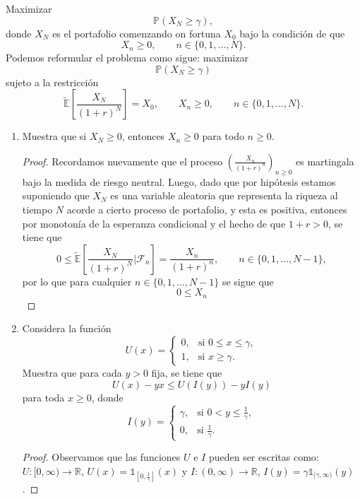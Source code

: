 \documentclass[letterpaper]{article}
\newcommand{\R}{\mathbb{R}}
\newcommand{\F}{\mathcal{F}}
\renewcommand{\to}{\rightarrow}
\newcommand{\E}{\mathbb{E}}
\renewcommand{\P}{\mathbb{P}}
\newcommand{\1}{\mathds{1}}
\theoremstyle{definition}
\theoremstyle{definition}
\theoremstyle{definition}
\theoremstyle{definition}
\theoremstyle{definition}
\begin{document}
\begin{enumerate}
    Maximizar 
    \[
    \P\left(X_N\geq\gamma\right),
    \]
    donde $X_N$ es el portafolio comenzando on fortuna $X_0$ bajo la condición de que 
    \[
    X_n\geq0, \qquad n\in \{0,1,...,N\}.    
    \]
    Podemos reformular el problema como sigue: maximizar 
    \[
    \P\left(X_N\geq \gamma\right)    
    \]
    sujeto a la restricción
    \[
        \tilde{\E}\left[\frac{X_N}{(1+r)^N}\right]=X_0, \qquad X_n\geq0, \qquad n\in \{0,1,...,N\}.
    \]
    \begin{enumerate}
        \item Muestra que si $X_N\geq0$, entonces $X_n\geq0$ para todo $n\geq0$.
        \begin{proof} 
          Recordamos nuevamente que el proceso $\left(\frac{X_n}{(1+r)^{n}}\right)_{n\geq0}$ es martingala
          bajo la medida de riesgo neutral. Luego, dado que por hipótesis estamos suponiendo que $X_N$ es 
          una variable aleatoria que representa la riqueza al tiempo $N$ acorde a cierto proceso de portafolio,
          y esta es positiva, entonces por
          monotonía de la esperanza condicional y el hecho de que $1+r>0$, se tiene que
          \[
          0\leq\tilde{\E}\left[\frac{X_N}{(1+r)^{N}}\big|\F_n\right]=\frac{X_n}{(1+r)^{n}}, \qquad n\in \{0,1,...,N-1\},
          \] 
          por lo que para cualquier $n\in \{0,1,...,N-1\}$ se sigue que 
          \[
          0\leq X_n  
          \]
         \end{proof}
        \item Considera la función 
        \begin{equation*}
            U(x) = \begin{cases}
                    0, & \text{si } 0\leq x\leq \gamma,\\
                    1, & \text{si } x\geq \gamma.
                    \end{cases}
        \end{equation*}
    Muestra que para cada $y>0$ fija, se tiene que $$U(x)-yx\leq U(I(y))-yI(y)$$    
    para toda $x\geq0$, donde 
    \begin{equation*}
        I(y)=\begin{cases}
            \gamma, & \text{si } 0<y\leq \frac{1}{\gamma},\\
            0, & \text{si } \frac{1}{\gamma}.
        \end{cases}
    \end{equation*}
    \begin{proof} 
      Observamos que las funciones $U$ e $I$ pueden ser escritas como: $U:[0,\infty)\to \R$, $U(x)=\1_{[0,\frac{1}{\gamma}]}(x)$ y  $I:(0,\infty)\to \R$, $I(y)=\gamma\1_{[\gamma,\infty)}(y)$.

\end{proof}
\end{enumerate}
\end{enumerate}
\end{document}
